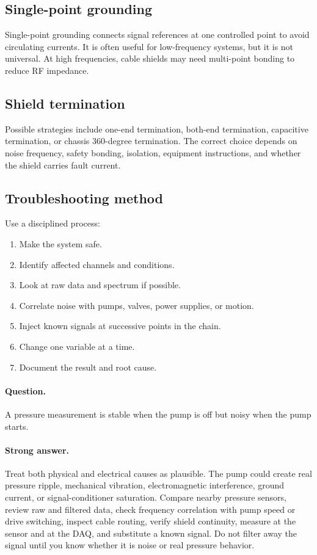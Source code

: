 \documentclass[11pt]{article}
\newcommand{\question}[1]{\paragraph{Question.} #1}
\newcommand{\stronganswer}[1]{\paragraph{Strong answer.} #1}
\begin{document}
\subsection{Single-point grounding}
Single-point grounding connects signal references at one controlled point to
avoid circulating currents. It is often useful for low-frequency systems, but it
is not universal. At high frequencies, cable shields may need multi-point bonding
to reduce RF impedance.

\subsection{Shield termination}
Possible strategies include one-end termination, both-end termination, capacitive
termination, or chassis 360-degree termination. The correct choice depends on
noise frequency, safety bonding, isolation, equipment instructions, and whether
the shield carries fault current.

\subsection{Troubleshooting method}
Use a disciplined process:
\begin{enumerate}
  \item Make the system safe.
  \item Identify affected channels and conditions.
  \item Look at raw data and spectrum if possible.
  \item Correlate noise with pumps, valves, power supplies, or motion.
  \item Inject known signals at successive points in the chain.
  \item Change one variable at a time.
  \item Document the result and root cause.
\end{enumerate}

\question{A pressure measurement is stable when the pump is off but noisy when the pump starts.}
\stronganswer{Treat both physical and electrical causes as plausible. The pump
could create real pressure ripple, mechanical vibration, electromagnetic
interference, ground current, or signal-conditioner saturation. Compare nearby
pressure sensors, review raw and filtered data, check frequency correlation with
pump speed or drive switching, inspect cable routing, verify shield continuity,
measure at the sensor and at the DAQ, and substitute a known signal. Do not
filter away the signal until you know whether it is noise or real pressure
behavior.}
\end{document}
